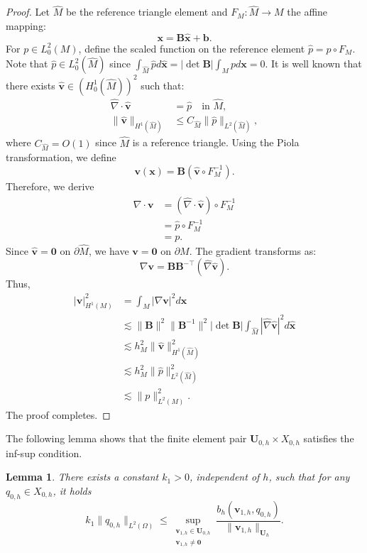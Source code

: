 \documentclass[a4paper,11pt,fleqn]{article}
\newtheorem{lemma}[theorem]{Lemma}
\numberwithin{equation}{section}
\begin{document}
\begin{proof}
	Let $\hat{M}$ be the reference triangle element and $F_M: \hat{M} \to M$ the affine mapping:
	\begin{equation*}
		\bm{x} = \bm{B}\hat{\bm{x}} + \bm{b}. 
	\end{equation*}
	For $p \in L^2_0(M)$, define the scaled function on the reference element $\hat{p} = p\circ F_M$.	Note that $\hat{p} \in L^2_0(\hat{M})$ since $\int_{\hat{M}} \hat{p}  d\hat{\bm{x}} = |\det \bm{B}|\int_M p  d\bm{x} = 0$. It is well known that there exists $\hat{\bm{v}} \in (H^1_0(\hat{M}))^2$ such that:
	\begin{align}
		\hat{\nabla} \cdot \hat{\bm{v}} &= \hat{p} \quad \text{in } \hat{M}, \label{eq:ref-div} \\
		\|\hat{\bm{v}}\|_{H^1(\hat{M})} &\leq C_{\hat{M}} \|\hat{p}\|_{L^2(\hat{M})}, \label{eq:ref-stab}
	\end{align}
	where $C_{\hat{M}} = O(1)$ since $\hat{M}$ is a reference triangle. Using the Piola transformation, we define
	\begin{equation}
		\bm{v}(\bm{x}) = \bm{B} (\hat{\bm{v}}\circ F_M^{-1}).
	\end{equation}
Therefore, we derive
	\begin{align*}
		\nabla \cdot \bm{v}
		&= (\hat{\nabla} \cdot \hat{\bm{v}})\circ F_M^{-1} \\
		&= \hat{p}\circ F_M^{-1} \\
		&= p.
	\end{align*}
Since $\hat{\bm{v}} = \bm{0}$ on $\partial\hat{M}$, we have $\bm{v} = \bm{0}$ on $\partial M$. The gradient transforms as:
	\begin{equation*}
		\nabla \bm{v} =  \bm{B} \bm{B}^{-\top}(\hat{\nabla} \hat{\bm{v}}) .
	\end{equation*}
	Thus,
	\begin{align*}
		|\bm{v}|_{H^1(M)}^2 
		&= \int_M |\nabla \bm{v}|^2 d\bm{x} \\
		&\lesssim \|\bm{B}\|^2 \|\bm{B}^{-1}\|^2 |\det\bm{B}|\int_{\hat{M}} |\hat{\nabla} \hat{\bm{v}}|^2 d\hat{\bm{x}} \\
		&\lesssim h_M^2\|\hat{\bm{v}}\|_{H^1(\hat{M})}^2\\
		&\lesssim h_M^2\|\hat{p}\|_{L^2(\hat{M})}^2\\
		&\lesssim \|p\|_{L^2(M)}^2.
	\end{align*}
The proof completes.
\end{proof}

The following lemma shows that the finite element pair $\bm{U}_{0,h}\times X_{0,h}$ satisfies the inf-sup condition.
\begin{lemma}\label{le:sup1}
	There exists a constant $k_1 > 0$, independent of $h$, such that for any $q_{0,h} \in X_{0,h}$, it holds
	\begin{equation}
		k_1\| q_{0,h} \|_{L^2(\Omega)} \leq \sup_{\substack{\boldsymbol{v}_{1,h} \in \boldsymbol{U}_{0,h} \\ \boldsymbol{v}_{1,h} \neq \bm{0}}} \frac{b_h(\boldsymbol{v}_{1,h}, q_{0,h})}{\|\boldsymbol{v}_{1,h}\|_{\boldsymbol{U}_{h}}}.
	\end{equation}
\end{lemma}
\end{document}
